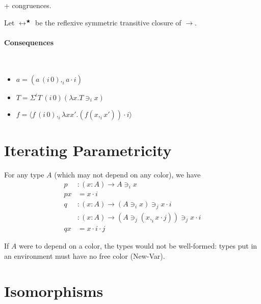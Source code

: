 \documentclass[english]{PaperTools/latex/lipics}
\newcommand\CP[3]{(#2,_{#1} #3)}
\newcommand\CSig[1]{\Sigma^{#1}}
\newcommand\param[1]{\!\cdot\!#1}
\newcommand\op[1]{∋_{#1}}
\newcommand\fp[3]{⟨#2 ,_{#1} #3⟩}
\newcommand\mor[2]{{#1}\,{#2}}
\newcommand\proj[2]{\mor{#2}{(#1\,0)}}
\begin{document}
+ congruences.

\begin{definition}[Conversion]
  Let $↔^★$ be the reflexive symmetric transitive closure of $→$.
\end{definition}

\paragraph{Consequences}
\begin{corollary}~
  \begin{itemize}
  \item $a = \CP i {\proj i a} {a \param i}$
  \item $T = \CSig i {\proj i T} {(λx. T \op i x)}$
  \item $f = \fp i {\proj i f} {λx x'. (f \CP i x {x'}) \param i}$
  \end{itemize}
\end{corollary}

\section{Iterating Parametricity}
For any type $A$ (which may not depend on any color), we have
\begin{align*}
p &: (x:A) → A \op i x\\
p x &= x\param i\\
q &: (x:A) → (A \op i x) \op j x \param  i\\
  &: (x:A) → (A \op j \CP i x {x \param j}) \op j x \param  i\\
q x &= x\param i\param j
\end{align*}

If $A$ were to depend on a color, the types would not be well-formed:
types put in an environment must have no free color ({\sc New-Var}).

\section{Isomorphisms}
\end{document}
